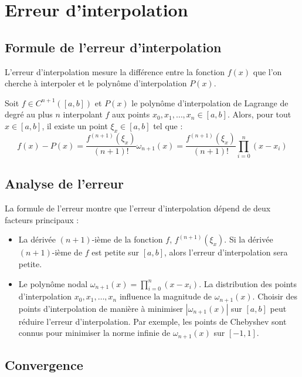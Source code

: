 \documentclass[oneside]{book}
\begin{document}
\section{Erreur d'interpolation}

\subsection{Formule de l'erreur d'interpolation}

L'erreur d'interpolation mesure la différence entre la fonction $f(x)$ que l'on cherche à interpoler et le polynôme d'interpolation $P(x)$.

\begin{proposition}
Soit $f \in C^{n+1}([a, b])$ et $P(x)$ le polynôme d'interpolation de Lagrange de degré au plus $n$ interpolant $f$ aux points $x_0, x_1, \dots, x_n \in [a, b]$. Alors, pour tout $x \in [a, b]$, il existe un point $\xi_x \in [a, b]$ tel que :
\[
f(x) - P(x) = \frac{f^{(n+1)}(\xi_x)}{(n+1)!} \omega_{n+1}(x) = \frac{f^{(n+1)}(\xi_x)}{(n+1)!} \prod_{i=0}^{n} (x - x_i)
\]
\end{proposition}

\subsection{Analyse de l'erreur}

La formule de l'erreur montre que l'erreur d'interpolation dépend de deux facteurs principaux :

\begin{itemize}
    \item La dérivée $(n+1)$-ième de la fonction $f$, $f^{(n+1)}(\xi_x)$. Si la dérivée $(n+1)$-ième de $f$ est petite sur $[a, b]$, alors l'erreur d'interpolation sera petite.
    \item Le polynôme nodal $\omega_{n+1}(x) = \prod_{i=0}^{n} (x - x_i)$. La distribution des points d'interpolation $x_0, x_1, \dots, x_n$ influence la magnitude de $\omega_{n+1}(x)$. Choisir des points d'interpolation de manière à minimiser $|\omega_{n+1}(x)|$ sur $[a, b]$ peut réduire l'erreur d'interpolation. Par exemple, les points de Chebyshev sont connus pour minimiser la norme infinie de $\omega_{n+1}(x)$ sur $[-1, 1]$.
\end{itemize}

\subsection{Convergence}
\end{document}
